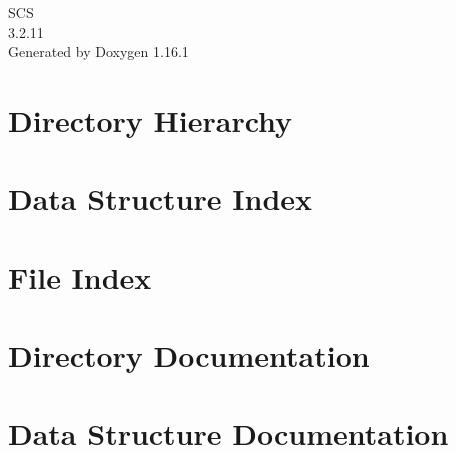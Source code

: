 \documentclass[twoside]{book}
\newcommand{\+}{\discretionary{\mbox{\scriptsize$\hookleftarrow$}}{}{}}
\newcommand{\clearemptydoublepage}{%
    \newpage{\pagestyle{empty}\cleardoublepage}%
  }
\begin{document}
  \raggedbottom
    \hypersetup{pageanchor=false,
                bookmarksnumbered=true,
                pdfencoding=unicode
               }
  \begin{titlepage}
  \vspace*{7cm}
  \begin{center}%
  {\Large SCS}\\
  [1ex]\large 3.\+2.\+11 \\
  \vspace*{1cm}
  {\large Generated by Doxygen 1.16.1}\\
  \end{center}
  \end{titlepage}
  \clearemptydoublepage
  \tableofcontents
  \clearemptydoublepage
  \hypersetup{pageanchor=true}
\chapter{Directory Hierarchy}

\chapter{Data Structure Index}

\chapter{File Index}

\chapter{Directory Documentation}



\chapter{Data Structure Documentation}














\end{document}
